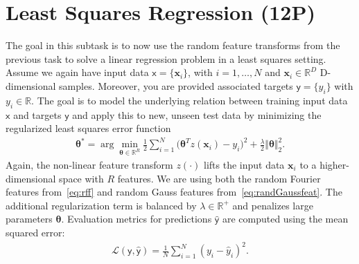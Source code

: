 \documentclass{article}
\renewcommand{\vec}[1]{\textbf{#1}}
\renewcommand{\vec}[1]{\textbf{#1}}
\begin{document}
\section{Least Squares Regression (12P)} \label{sec:lsq}
The goal in this subtask is to now use the random feature transforms from the previous task to solve a linear regression problem in a least squares setting. 
Assume we again have input data $\boldsymbol{\mathsf{x}} = \{ \vec x_i\}$, with $i=1,\dots,N$ and $\vec x_i \in \mathbb{R}^D$ D-dimensional samples. Moreover, you are provided associated targets $\boldsymbol{\mathsf{y}}= \{ y_i\}$ with $ y_i \in \mathbb{R}$.
The goal is to model the underlying relation between training input data $\boldsymbol{\mathsf{x}}$ and targets $\boldsymbol{\mathsf{y}}$ and apply this to new, unseen test data by minimizing the regularized least squares error function
\begin{eqnarray}\label{eq:lsq}
\bm \theta^\ast = \arg \min_{\bm \theta \in \mathbb{R}^R} \frac{1}{2} \sum_{i=1}^N \bigg(\bm \theta^T z( \vec x_i) - y_i\bigg)^2  + \frac \lambda 2  \Vert \bm  \theta \Vert_2^2.
\end{eqnarray}
Again, the non-linear feature transform $z(\cdot)$ lifts the input data $\vec x_i$ to a higher-dimensional space with $R$ features. We are using both the random Fourier features from~\eqref{eq:rff} and random Gauss features from~\eqref{eq:randGaussfeat}. 
The additional regularization term is balanced by $\lambda \in \mathbb{R}^+$ and penalizes large parameters $\bm \theta$. 
Evaluation metrics for predictions $\hat{\boldsymbol{\mathsf{y}}}$ are computed using the mean squared error:
\begin{eqnarray} \label{eq:quadloss}
\mathcal{L}(\boldsymbol{\mathsf{y}},\hat{\boldsymbol{\mathsf{y}}}) = \frac 1 N \sum_{i=1}^N ( y_i - \hat{y}_i)^2.
\end{eqnarray}
\end{document}
